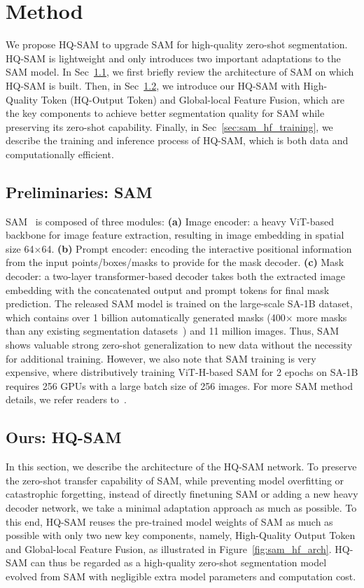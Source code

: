 \section{Method}
We propose HQ-SAM to upgrade SAM for high-quality zero-shot segmentation. HQ-SAM is lightweight and only introduces two important adaptations to the SAM model. In Sec~\ref{sec:sam}, we first briefly review the architecture of SAM on which HQ-SAM is built. Then, in Sec~\ref{sec:sam_hf}, we introduce our HQ-SAM with High-Quality Token (HQ-Output Token) and Global-local Feature Fusion, which are the key components to achieve better segmentation quality for SAM while preserving its zero-shot capability. Finally, in Sec~\ref{sec:sam_hf_training}, we describe the training and inference process of HQ-SAM, which is both data and computationally efficient.

\subsection{Preliminaries: SAM}
\label{sec:sam}

SAM~\cite{sam} is composed of three modules: \textbf{(a)} Image encoder: a heavy ViT-based backbone for image feature extraction, resulting in image embedding in spatial size 64$\times$64. \textbf{(b)} Prompt encoder: encoding the interactive positional information from the input points/boxes/masks to provide for the mask decoder. \textbf{(c)} Mask decoder: a two-layer transformer-based decoder takes both the extracted image embedding with the concatenated output and prompt tokens for final mask prediction. The released SAM model is trained on the large-scale SA-1B dataset, which contains over 1 billion automatically generated masks (400$\times$ more masks than any existing segmentation datasets~\cite{gupta2019lvis,kuznetsova2020open}) and 11 million images. Thus, SAM shows valuable strong zero-shot generalization to new data without the necessity for additional training. However, we also note that SAM training is very expensive, where distributively training ViT-H-based SAM for 2 epochs on SA-1B requires 256 GPUs with a large batch size of 256 images. For more SAM method details, we refer readers to~\cite{sam}.

\subsection{Ours: HQ-SAM}
\label{sec:sam_hf}
In this section, we describe the architecture of the HQ-SAM network. To preserve the zero-shot transfer capability of SAM, while preventing model overfitting or catastrophic forgetting, instead of directly finetuning SAM or adding a new heavy decoder network, we take a minimal adaptation approach as much as possible. To this end, HQ-SAM reuses the pre-trained model weights of SAM as much as possible with only two new key components, namely, High-Quality Output Token and Global-local Feature Fusion, as illustrated in Figure~\ref{fig:sam_hf_arch}. 
HQ-SAM can thus be regarded  as a high-quality zero-shot segmentation model evolved from SAM with negligible extra model parameters and computation cost.

